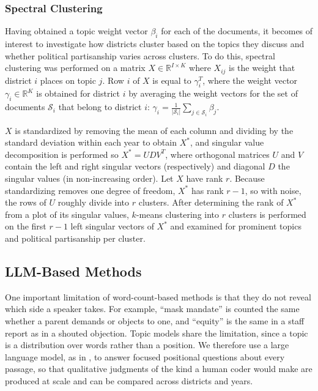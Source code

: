 \documentclass[12pt]{article}
\begin{document}
\subsubsection{Spectral Clustering}
Having obtained a topic weight vector $\beta_i$ for each of the documents, it becomes of interest to investigate how districts cluster based on the topics they discuss and whether political partisanship varies across clusters. To do this, spectral clustering was performed on a matrix $X \in \mathbb R^{I \times K}$ where $X_{ij}$ is the weight that district $i$ places on topic $j$. Row $i$ of $X$ is equal to $\gamma_i^T$, where the weight vector $\gamma_i \in \mathbb R^K$ is obtained for district $i$ by averaging the weight vectors for the set of documents $\mathcal S_i$ that belong to district $i$: $\gamma_i = \frac{1}{|\mathcal S_i|} \sum_{j \in \mathcal S_i} \beta_j$.

$X$ is standardized by removing the mean of each column and dividing by the standard deviation within each year to obtain $X^*$, and singular value decomposition is performed so $X^* = UDV^T$, where orthogonal matrices $U$ and $V$ contain the left and right singular vectors (respectively) and diagonal $D$ the singular values (in non-increasing order). Let $X$ have rank $r$. Because standardizing removes one degree of freedom, $X^*$ has rank $r-1$, so with noise, the rows of $U$ roughly divide into $r$ clusters. After determining the rank of $X^*$ from a plot of its singular values, $k$-means clustering into $r$ clusters is performed on the first $r-1$ left singular vectors of $X^*$ and examined for prominent topics and political partisanship per cluster.


\subsection{LLM-Based Methods}\label{sec:m-llm}

One important limitation of word-count-based methods is that they do not reveal which side a speaker takes. For example, ``mask mandate'' is counted the same whether a parent demands or objects to one, and ``equity'' is the same in a staff report as in a shouted objection. Topic models share the limitation, since a topic is a distribution over words rather than a position. We therefore use a large language model, as in \citet{asirvatham_gpt_2026}, to answer focused positional questions about every passage, so that qualitative judgments of the kind a human coder would make are produced at scale and can be compared across districts and years.
\end{document}
